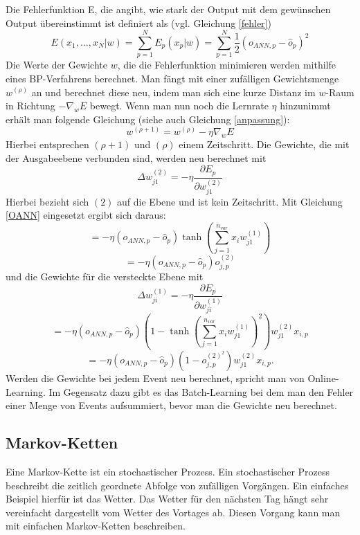 \documentclass[12pt]{article}
\begin{document}
Die Fehlerfunktion E, die angibt, wie stark der Output mit dem gewünschen Output übereinstimmt ist definiert als (vgl. Gleichung \ref{fehler})
\begin{equation}E(x_1,...,x_N|w)=\sum_{p=1}^N E_p(x_p|w)=\sum^N_{p=1}\frac{1}{2}(o_{ANN,p}-\hat{o}_p)^2\end{equation}
Die Werte der Gewichte $w$, die die Fehlerfunktion minimieren werden mithilfe eines BP-Verfahrens berechnet. Man fängt mit einer zufälligen Gewichtsmenge $w^{(\rho)}$ an und berechnet diese neu, indem man sich eine kurze Distanz im $w$-Raum in Richtung $-\nabla_wE$ bewegt. Wenn man nun noch die Lernrate $\eta$ hinzunimmt erhält man folgende Gleichung (siehe auch Gleichung \ref{anpassung}):
\begin{equation}w^{(\rho+1)}=w^{(\rho)}-\eta\nabla_wE\end{equation}
Hierbei entsprechen $(\rho+1)$ und $(\rho)$ einem Zeitschritt. Die Gewichte, die mit der Ausgabeebene verbunden sind, werden neu berechnet mit 
\begin{equation}\Delta w_{j1}^{(2)}=-\eta\frac{\partial E_p}{\partial w_{j1}^{(2)}}\end{equation}
Hierbei bezieht sich $(2)$ auf die Ebene und ist kein Zeitschritt.
Mit Gleichung \ref{OANN} eingesetzt ergibt sich daraus:
\begin{equation}=-\eta(o_{ANN,p}-\hat{o}_p)\tanh\left(\sum^{n_{var}}_{j=1}x_iw_{j1}^{(1)}\right)\end{equation}
\begin{equation}=-\eta(o_{ANN,p}-\hat{o}_p)o^{(2)}_{j,p}\end{equation}
und die Gewichte für die versteckte Ebene mit
\begin{equation}\Delta w_{ji}^{(1)}=-\eta\frac{\partial E_p}{\partial w_{ji}^{(1)}}\end{equation}
\begin{equation}=-\eta(o_{ANN,p}-\hat{o}_p)\left(1-\tanh\left(\sum^{n_{var}}_{j=1}x_iw_{j1}^{(1)}\right)^2\right)w_{j1}^{(2)}x_{i,p}\end{equation}
\begin{equation}=-\eta(o_{ANN,p}-\hat{o}_p)(1-o^{(2)^2}_{j,p})w_{j1}^{(2)}x_{i,p}.\end{equation}
Werden die Gewichte bei jedem Event neu berechnet, spricht man von Online-Learning. Im Gegensatz dazu gibt es das Batch-Learning bei dem man den Fehler einer Menge von Events aufsummiert, bevor man die Gewichte neu berechnet.
	\subsection{Markov-Ketten}
	Eine Markov-Kette ist ein stochastischer Prozess. Ein stochastischer Prozess beschreibt die zeitlich geordnete Abfolge von zufälligen Vorgängen. Ein einfaches Beispiel hierfür ist das Wetter. Das Wetter für den nächsten Tag hängt sehr vereinfacht dargestellt vom Wetter des Vortages ab. Diesen Vorgang kann man mit einfachen Markov-Ketten beschreiben.
\end{document}

